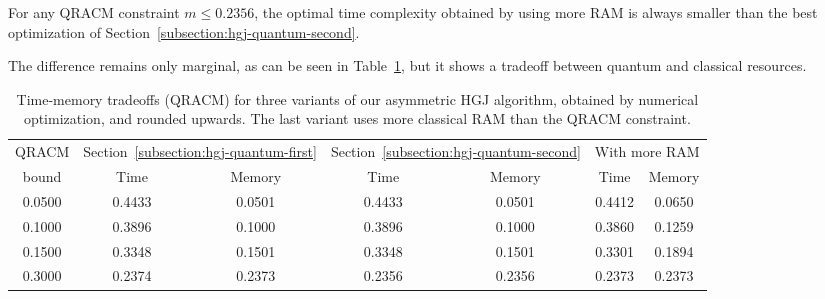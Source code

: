 \begin{fact}
For any QRACM constraint $m \leq 0.2356$, the optimal time complexity obtained by using more RAM is always smaller than the best optimization of Section~\ref{subsection:hgj-quantum-second}.
\end{fact}

The difference remains only marginal, as can be seen in Table~\ref{table:hgj-tradeoffs}, but it shows a tradeoff between quantum and classical resources.


\begin{table}[htbp]
\centering
\caption{Time-memory tradeoffs (QRACM) for three variants of our asymmetric HGJ algorithm, obtained by numerical optimization, and rounded upwards. The last variant uses more classical RAM than the QRACM constraint.}
\label{table:hgj-tradeoffs}

\begin{tabular}{ccccccc}
\toprule
QRACM & \multicolumn{2}{c}{ Section~\ref{subsection:hgj-quantum-first} } & \multicolumn{2}{c}{ Section~\ref{subsection:hgj-quantum-second} } & \multicolumn{2}{c}{With more RAM} \\
bound & Time & Memory & Time & Memory & Time & Memory \\
\midrule
0.0500 & 0.4433 & 0.0501 & 0.4433 & 0.0501 & 0.4412 & 0.0650\\
0.1000 & 0.3896 & 0.1000 & 0.3896 & 0.1000 & 0.3860 & 0.1259\\
0.1500 & 0.3348 & 0.1501 & 0.3348 & 0.1501 & 0.3301 & 0.1894\\
0.3000 & 0.2374 & 0.2373 & 0.2356 & 0.2356 & 0.2373 & 0.2373\\
\bottomrule
\end{tabular}
\end{table}

